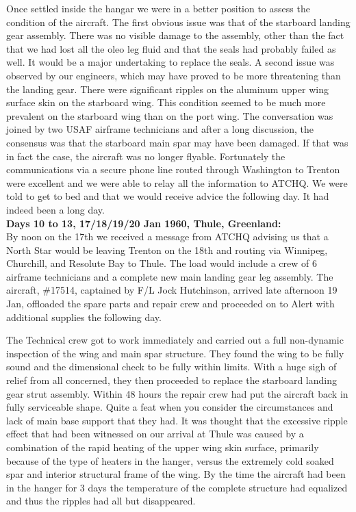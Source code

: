 Once settled inside the hangar we were in a better position to assess
the condition of the aircraft. The first obvious issue was that of the
starboard landing gear assembly. There was no visible damage to the
assembly, other than the fact that we had lost all the oleo leg fluid
and that the seals had probably failed as well. It would be a major
undertaking to replace the seals. A second issue was observed by our
engineers, which may have proved to be more threatening than the
landing gear. There were significant ripples on the aluminum upper wing
surface skin on the starboard wing. This condition seemed to be much
more prevalent on the starboard wing than on the port wing. The
conversation was joined by two USAF airframe technicians and after a
long discussion, the consensus was that the starboard main spar may
have been damaged. If that was in fact the case, the aircraft was no
longer flyable. Fortunately the communications via a secure phone line
routed through Washington to Trenton were excellent and we were able to
relay all the information to ATCHQ. We were told to get to bed and that
we would receive advice the following day. It had indeed been a long
day.\\

\noindent\textbf{Days 10 to 13, 17/18/19/20 Jan 1960, Thule, Greenland:}\\

By noon on the 17th we received a message from ATCHQ advising us that a
North Star would be leaving Trenton on the 18th and routing via
Winnipeg, Churchill, and Resolute Bay to Thule. The load would include
a crew of 6 airframe technicians and a complete new main landing gear
leg assembly. The aircraft, \#17514, captained by F/L Jock Hutchinson,
arrived late afternoon 19 Jan, offloaded the spare parts and repair
crew and proceeded on to Alert with additional supplies the following
day.

The Technical crew got to work immediately and carried out a full
non-dynamic inspection of the wing and main spar structure. They found
the wing to be fully sound and the dimensional check to be fully within
limits. With a huge sigh of relief from all concerned, they then
proceeded to replace the starboard landing gear strut assembly. Within
48 hours the repair crew had put the aircraft back in fully serviceable
shape. Quite a feat when you consider the circumstances and lack of
main base support that they had. It was thought that the excessive
ripple effect that had been witnessed on our arrival at Thule was
caused by a combination of the rapid heating of the upper wing skin
surface, primarily because of the type of heaters in the hanger, versus
the extremely cold soaked spar and interior structural frame of the
wing. By the time the aircraft had been in the hanger for 3 days the
temperature of the complete structure had equalized and thus the
ripples had all but disappeared.\\

